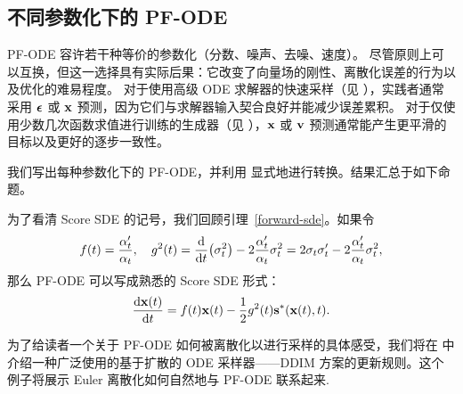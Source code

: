 \subsection{不同参数化下的 PF-ODE}\label{subsec:pf-ode-different-para} 
PF-ODE 容许若干种等价的参数化（分数、噪声、去噪、速度）。
尽管原则上可以互换，但这一选择具有实际后果：它改变了向量场的刚性、离散化误差的行为以及优化的难易程度。
对于使用高级 ODE 求解器的快速采样（见 ），实践者通常采用 ${\bm{\epsilon}}$ 或 ${\mathbf{x}}$ 预测，因为它们与求解器输入契合良好并能减少误差累积。
对于仅使用少数几次函数求值进行训练的生成器（见 ），${\mathbf{x}}$ 或 ${\mathbf{v}}$ 预测通常能产生更平滑的目标以及更好的逐步一致性。


我们写出每种参数化下的 PF-ODE，并利用  显式地进行转换。结果汇总于如下命题。

为了看清 Score SDE 的记号，我们回顾引理~\ref{forward-sde}。如果令
\[
f(t) = \frac{\alpha_t'}{\alpha_t}, 
\quad
g^2(t) = \frac{\mathop{}\!\mathrm{d}}{\mathop{}\!\mathrm{d} t} \big(\sigma_t^2\big) 
         - 2 \frac{\alpha_t'}{\alpha_t} \sigma_t^2
       = 2\sigma_t\sigma_t' - 2 \frac{\alpha_t'}{\alpha_t} \sigma_t^2,
\]
那么 PF-ODE 可以写成熟悉的 Score SDE 形式：
\[
\frac{\mathop{}\!\mathrm{d} {\mathbf{x}}(t)}{\mathop{}\!\mathrm{d} t}
= f(t) {\mathbf{x}}(t)  -  \frac{1}{2} g^2(t) {\mathbf{s}}^*({\mathbf{x}}(t),t).
\]

为了给读者一个关于 PF-ODE 如何被离散化以进行采样的具体感受，我们将在  中介绍一种广泛使用的基于扩散的 ODE 采样器——DDIM 方案的更新规则。这个例子将展示 Euler 离散化如何自然地与 PF-ODE 联系起来.







